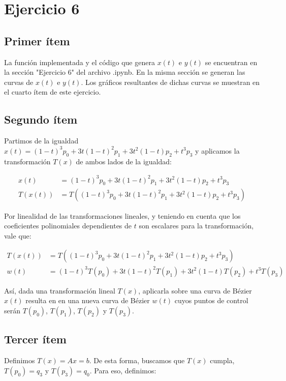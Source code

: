 \documentclass{article}
\begin{document}
\section*{Ejercicio 6}
\subsection*{Primer ítem}
La función implementada y el código que genera $x(t)$ e $y(t)$ se encuentran en la sección "Ejercicio 6" del archivo .ipynb. En la misma sección se generan las curvas de $x(t)$ e $y(t)$. Los gráficos resultantes de dichas curvas se muestran en el cuarto ítem de este ejercicio.

\subsection*{Segundo ítem}
Partimos de la igualdad $x(t) = (1 - t)^3 p_0 + 3t(1 - t)^2 p_1 + 3t^2(1 - t) p_2 + t^3 p_3$ y aplicamos la transformación $T(x)$ de ambos lados de la igualdad:

$$
\begin{aligned}
x(t) &= (1 - t)^3 p_0 + 3t(1 - t)^2 p_1 + 3t^2(1 - t) p_2 + t^3 p_3 \\
T(x(t)) &= T((1 - t)^3 p_0 + 3t(1 - t)^2 p_1 + 3t^2(1 - t) p_2 + t^3 p_3)
\end{aligned}
$$

Por linealidad de las transformaciones lineales, y teniendo en cuenta que los coeficientes polinomiales dependientes de $t$ son escalares para la transformación, vale que:

$$
\begin{aligned}
T(x(t)) &= T((1 - t)^3 p_0 + 3t(1 - t)^2 p_1 + 3t^2(1 - t) p_2 + t^3 p_3) \\
w(t) &= (1 - t)^3 T(p_0) + 3t(1 - t)^2 T(p_1) + 3t^2(1 - t) T(p_2) + t^3 T(p_3)
\end{aligned}
$$

Así, dada una transformación lineal $T(x)$, aplicarla sobre una curva de Bézier $x(t)$ resulta en en una nueva curva de Bézier $w(t)$ cuyos puntos de control serán  $T(p_0)$,  $T(p_1)$,  $T(p_2)$ y  $T(p_3)$.

\subsection*{Tercer ítem}
Definimos $T(x) = Ax = b$. De esta forma, buscamos que $T(x)$ cumpla, $T(p_0) = q_3$ y $T(p_3) = q_0$. 
Para eso, definimos: 
\end{document}
